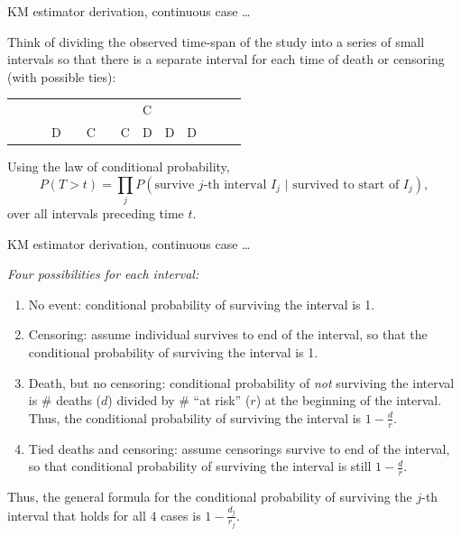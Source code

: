\documentclass[ignorenonframetext,]{beamer}
\begin{document}
\begin{frame}{%
\protect\hypertarget{km-estimator-derivation-continuous-case-1}{%
KM estimator derivation, continuous case \ldots}}

Think of dividing the observed time-span of the study into a series of
small intervals so that there is a separate interval for each time of
death or censoring (with possible ties):

\begin{center}
\begin{tabular}{l|p{.4in}|p{.4in}|p{.4in}
 |p{.4in}|p{.4in}|p{.4in}|p{.4in}|p{.4in}|p{.4in}|p{.4in}
 |p{.4in}|p{.4in}|p{.4in}}
  &   &  &   & &   & &   & C &   &   \\
  &   &  & D & & C & & C & D & D & D \\  \hline
\end{tabular}
\end{center}

Using the law of conditional probability,
\[P(T > t) = \prod_j P(\text{survive $j$-th interval $I_j$ | survived to start of $I_j$}), \]
over all intervals preceding time \(t\).

\end{frame}

\begin{frame}{%
\protect\hypertarget{km-estimator-derivation-continuous-case-2}{%
KM estimator derivation, continuous case \ldots}}

\emph{Four possibilities for each interval:}

\begin{enumerate}
[1.]
\item
  No event: conditional probability of surviving the interval is 1.
\item
  Censoring: assume individual survives to end of the interval, so that
  the conditional probability of surviving the interval is 1.
\item
  Death, but no censoring: conditional probability of \emph{not}
  surviving the interval is \# deaths (\(d\)) divided by \# “at risk”
  (\(r\)) at the beginning of the interval. Thus, the conditional
  probability of surviving the interval is \(1 - \frac{d}{r}\).
\item
  Tied deaths and censoring: assume censorings survive to end of the
  interval, so that conditional probability of surviving the interval is
  still \(1 - \frac{d}{r}\).
\end{enumerate}

Thus, the general formula for the conditional probability of surviving
the \(j\)-th interval that holds for all 4 cases is
\(1-\frac{d_j}{r_j}\).

\end{frame}
\end{document}
